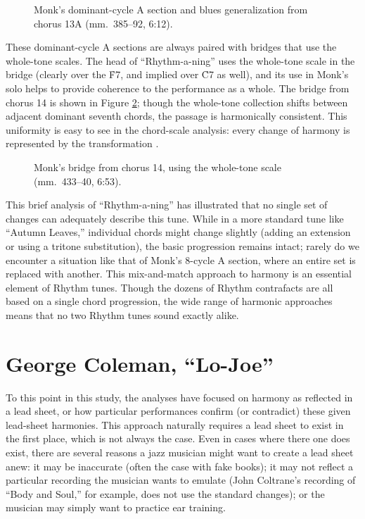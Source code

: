 \begin{figure}[tbp]
  \caption[Monk's dominant-cycle A section and blues generalization.]{%
    Monk's dominant-cycle A section and blues generalization from chorus
    13A (mm.~385--92, 6:12).}
  \label{ran:monk-cycle-a}
\end{figure}

These dominant-cycle A sections are always paired with bridges that use the
whole-tone scales. The head of ``Rhythm-a-ning'' uses the whole-tone scale in
the bridge (clearly over the \h{F7}, and implied over \h{C7} as well), and its
use in Monk's solo helps to provide coherence to the performance as a whole.
The bridge from chorus 14 is shown in Figure \ref{ran:monk-wt-bridge}; though
the whole-tone collection shifts between adjacent dominant seventh chords, the
passage is harmonically consistent. This uniformity is easy to see in the
chord-scale analysis: every change of harmony is represented by the
transformation .

\begin{figure}[tbp]
  \caption[Monk's bridge from chorus 14, using the whole-tone scale.]{%
    Monk's bridge from chorus 14, using the whole-tone scale (mm.~433--40, 6:53).}
  \label{ran:monk-wt-bridge}
\end{figure}

This brief analysis of ``Rhythm-a-ning'' has illustrated that no single set of
changes can adequately describe this tune. While in a more standard tune like
``Autumn Leaves,'' individual chords might change slightly (adding an
extension or using a tritone substitution), the basic progression remains
intact; rarely do we encounter a situation like that of Monk's 8-cycle A
section, where an entire set is replaced with another. This mix-and-match
approach to harmony is an essential element of Rhythm tunes. Though the dozens
of Rhythm contrafacts are all based on a single chord progression, the wide
range of harmonic approaches means that no two Rhythm tunes sound exactly alike.

\section{George Coleman, “Lo-Joe”}
\label{sec:lo-joe}

To this point in this study, the analyses have focused on harmony as
reflected in a lead sheet, or how particular performances confirm (or
contradict) these given lead-sheet harmonies. This approach naturally requires
a lead sheet to exist in the first place, which is not always the case. Even in
cases where there one does exist, there are several reasons a jazz musician
might want to create a lead sheet anew: it may be inaccurate (often the case
with fake books); it may not reflect a particular recording the musician wants
to emulate (John Coltrane's recording of ``Body and Soul,'' for example, does
not use the standard changes); or the musician may simply want to practice ear
training.

